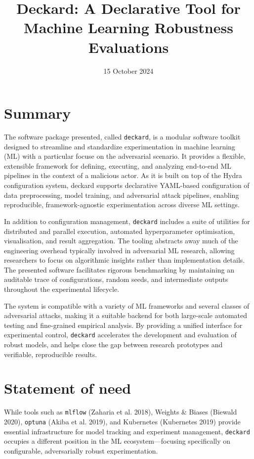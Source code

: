 \documentclass[
]{article}
\title{Deckard: A Declarative Tool for Machine Learning Robustness
Evaluations}
\author{}
\date{\vspace{-2.5em}15 October 2024}
\begin{document}
\maketitle

\hypertarget{summary}{%
\section{Summary}\label{summary}}

The software package presented, called \texttt{deckard}, is a modular
software toolkit designed to streamline and standardize experimentation
in machine learning (ML) with a particular focuse on the adversarial
scenario. It provides a flexible, extensible framework for defining,
executing, and analyzing end-to-end ML pipelines in the context of a
malicious actor. As it is built on top of the Hydra configuration
system, deckard supports declarative YAML-based configuration of data
preprocessing, model training, and adversarial attack pipelines,
enabling reproducible, framework-agnostic experimentation across diverse
ML settings.

In addition to configuration management, \texttt{deckard} includes a
suite of utilities for distributed and parallel execution, automated
hyperparameter optimisation, visualisation, and result aggregation. The
tooling abstracts away much of the engineering overhead typically
involved in adversarial ML research, allowing researchers to focus on
algorithmic insights rather than implementation details. The presented
software facilitates rigorous benchmarking by maintaining an auditable
trace of configurations, random seeds, and intermediate outputs
throughout the experimental lifecycle.

The system is compatible with a variety of ML frameworks and several
classes of adversarial attacks, making it a suitable backend for both
large-scale automated testing and fine-grained empirical analysis. By
providing a unified interface for experimental control, \texttt{deckard}
accelerates the development and evaluation of robust models, and helps
close the gap between research prototypes and verifiable, reproducible
results.

\hypertarget{statement-of-need}{%
\section{Statement of need}\label{statement-of-need}}

While tools such as \texttt{mlflow} (Zaharia et al. 2018), Weights \&
Biases (Biewald 2020), \texttt{optuna} (Akiba et al. 2019), and
Kubernetes (Kubernetes 2019) provide essential infrastructure for model
tracking and experiment management, \texttt{deckard} occupies a
different position in the ML ecosystem---focusing specifically on
configurable, adversarially robust experimentation.
\end{document}
